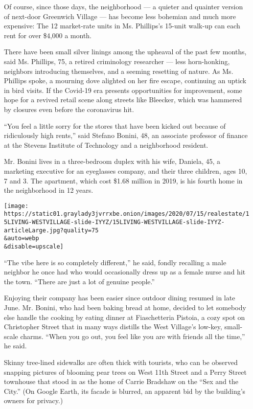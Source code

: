 Of course, since those days, the neighborhood --- a quieter and quainter
version of next-door Greenwich Village --- has become less bohemian and
much more expensive: The 12 market-rate units in Ms. Phillips's 15-unit
walk-up can each rent for over \$4,000 a month.

There have been small silver linings among the upheaval of the past few
months, said Ms. Phillips, 75, a retired criminology researcher --- less
horn-honking, neighbors introducing themselves, and a seeming resetting
of nature. As Ms. Phillips spoke, a mourning dove alighted on her fire
escape, continuing an uptick in bird visits. If the Covid-19 era
presents opportunities for improvement, some hope for a revived retail
scene along streets like Bleecker, which was hammered by closures even
before the coronavirus hit.

``You feel a little sorry for the stores that have been kicked out
because of ridiculously high rents,'' said Stefano Bonini, 48, an
associate professor of finance at the Stevens Institute of Technology
and a neighborhood resident.

Mr. Bonini lives in a three-bedroom duplex with his wife, Daniela, 45, a
marketing executive for an eyeglasses company, and their three children,
ages 10, 7 and 3. The apartment, which cost \$1.68 million in 2019, is
his fourth home in the neighborhood in 12 years.

\texttt{[image: https://static01.graylady3jvrrxbe.onion/images/2020/07/15/realestate/15LIVING-WESTVILLAGE-slide-IYYZ/15LIVING-WESTVILLAGE-slide-IYYZ-articleLarge.jpg?quality=75\\\&auto=webp\\\&disable=upscale]}

``The vibe here is so completely different,'' he said, fondly recalling
a male neighbor he once had who would occasionally dress up as a female
nurse and hit the town. ``There are just a lot of genuine people.''

Enjoying their company has been easier since outdoor dining resumed in
late June. Mr. Bonini, who had been baking bread at home, decided to let
somebody else handle the cooking by eating dinner at Fiaschetteria
Pistoia, a cozy spot on Christopher Street that in many ways distills
the West Village's low-key, small-scale charms. ``When you go out, you
feel like you are with friends all the time,'' he said.

Skinny tree-lined sidewalks are often thick with tourists, who can be
observed snapping pictures of blooming pear trees on West 11th Street
and a Perry Street townhouse that stood in as the home of Carrie
Bradshaw on the ``Sex and the City.'' (On Google Earth, its facade is
blurred, an apparent bid by the building's owners for privacy.)

